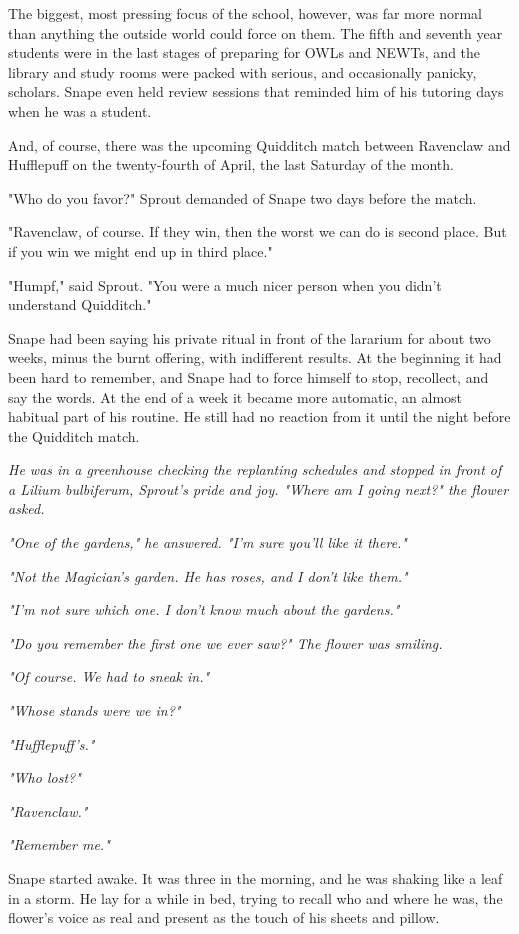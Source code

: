 The biggest, most pressing focus of the school, however, was far more normal than anything the outside world could force on them. The fifth and seventh year students were in the last stages of preparing for OWLs and NEWTs, and the library and study rooms were packed with serious, and occasionally panicky, scholars. Snape even held review sessions that reminded him of his tutoring days when he was a student.

And, of course, there was the upcoming Quidditch match between Ravenclaw and Hufflepuff on the twenty-fourth of April, the last Saturday of the month.

"Who do you favor?" Sprout demanded of Snape two days before the match.

"Ravenclaw, of course. If they win, then the worst we can do is second place. But if you win we might end up in third place."

"Humpf," said Sprout. "You were a much nicer person when you didn't understand Quidditch."

Snape had been saying his private ritual in front of the lararium for about two weeks, minus the burnt offering, with indifferent results. At the beginning it had been hard to remember, and Snape had to force himself to stop, recollect, and say the words. At the end of a week it became more automatic, an almost habitual part of his routine. He still had no reaction from it until the night before the Quidditch match.

\emph{He was in a greenhouse checking the replanting schedules and stopped in front of a Lilium bulbiferum, Sprout's pride and joy. "Where am I going next?" the flower asked.}

\emph{"One of the gardens," he answered. "I'm sure you'll like it there."}

\emph{"Not the Magician's garden. He has roses, and I don't like them."}

\emph{"I'm not sure which one. I don't know much about the gardens."}

\emph{"Do you remember the first one we ever saw?" The flower was smiling.}

\emph{"Of course. We had to sneak in."}

\emph{"Whose stands were we in?"}

\emph{"Hufflepuff's."}

\emph{"Who lost?"}

\emph{"Ravenclaw."}

\emph{"Remember me."}

Snape started awake. It was three in the morning, and he was shaking like a leaf in a storm. He lay for a while in bed, trying to recall who and where he was, the flower's voice as real and present as the touch of his sheets and pillow.

